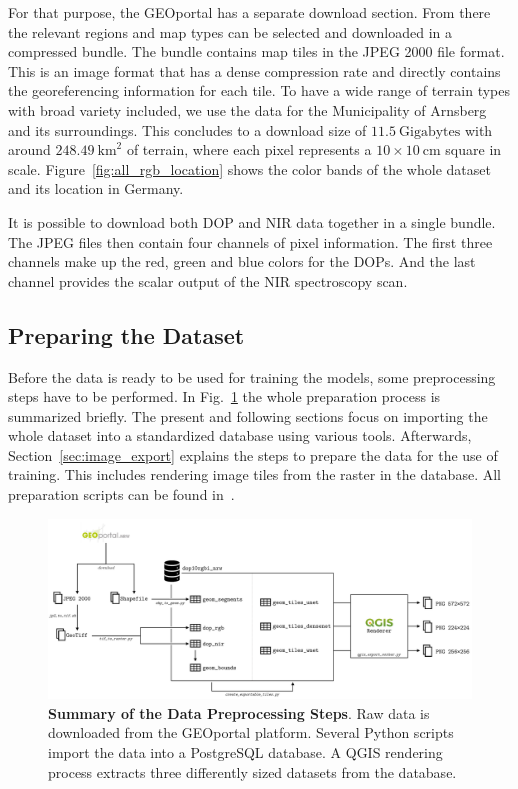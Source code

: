 For that purpose, the GEOportal has a separate download section. From there the relevant regions and map types can be selected and downloaded in a compressed bundle. The bundle contains map tiles in the JPEG 2000 file format. This is an image format that has a dense compression rate and directly contains the georeferencing information for each tile. To have a wide range of terrain types with broad variety included, we use the data for the Municipality of Arnsberg and its surroundings. This concludes to a download size of $11.5~\text{Gigabytes}$ with around $248.49~\text{km}^2$ of terrain, where each pixel represents a $10\times 10~\text{cm}$ square in scale. Figure~\ref{fig:all_rgb_location} shows the color bands of the whole dataset and its location in Germany.

It is possible to download both DOP and NIR data together in a single bundle. The JPEG files then contain four channels of pixel information. The first three channels make up the red, green and blue colors for the DOPs. And the last channel provides the scalar output of the NIR spectroscopy scan.

\subsection{Preparing the Dataset}
Before the data is ready to be used for training the models, some preprocessing steps have to be performed. In Fig.~\ref{fig:data_preprocessing} the whole preparation process is summarized briefly. The present and following sections focus on importing the whole dataset into a standardized database using various tools. Afterwards, Section~\ref{sec:image_export} explains the steps to prepare the data for the use of training. This includes rendering image tiles from the raster in the database. All preparation scripts can be found in~\cite{thesis-code20}.

\begin{figure}[h]
    \centering
    \includegraphics[width=\textwidth]{images/data_preprocessing}
    \caption[Summary of the Data Preprocessing Steps]
    {\textbf{Summary of the Data Preprocessing Steps}. Raw data is downloaded from the GEOportal platform. Several Python scripts import the data into a PostgreSQL database. A QGIS rendering process extracts three differently sized datasets from the database.}
    \label{fig:data_preprocessing}
\end{figure}

